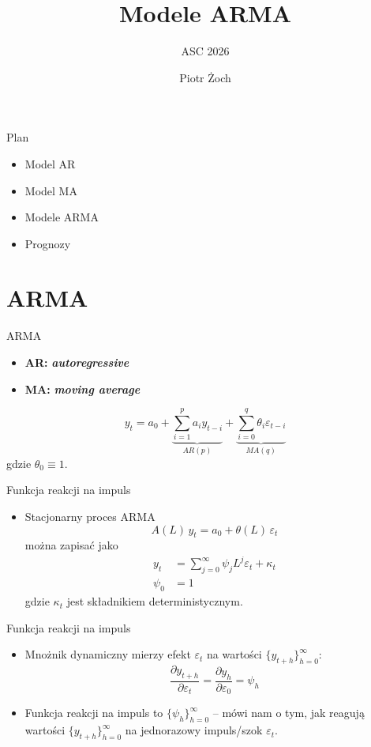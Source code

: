\documentclass[11pt,usenames,dvipsnames,aspectratio=169]{beamer}
\title{Modele ARMA}
\subtitle{ASC 2026}
\author{Piotr Żoch}
\date{}
\begin{document}
\begin{frame}[plain]
\vspace*{-0.6cm}
\titlepage
\end{frame}

\begin{frame}{Plan}
\begin{itemize}
    \item Model AR
    \item Model MA
    \item Modele ARMA
    \item Prognozy
\end{itemize}
\end{frame}

\section{ARMA}

\begin{frame}{ARMA}
\begin{itemize}
    \item \textbf{AR:} \textbf{\emph{autoregressive}}
    \item \textbf{MA:} \textbf{\emph{moving average}}
\end{itemize}
\[
y_{t}=a_{0}+\underbrace{\sum_{i=1}^{p}a_{i}y_{t-i}}_{AR(p)}+\underbrace{\sum_{i=0}^{q}\theta_{i}\varepsilon_{t-i}}_{MA(q)}
\]
gdzie $\theta_{0}\equiv 1$.
\end{frame}

\begin{frame}{Funkcja reakcji na impuls}
\begin{itemize}
    \item Stacjonarny proces ARMA
    \[
    A(L)\,y_{t}=a_{0}+\theta(L)\,\varepsilon_{t}
    \]
    można zapisać jako
    \begin{align*}
    y_{t} & =\sum_{j=0}^{\infty}\psi_{j}L^{j}\varepsilon_{t}+\kappa_{t}\\
    \psi_{0} & =1
    \end{align*}
    gdzie $\kappa_{t}$ jest składnikiem deterministycznym.
\end{itemize}
\end{frame}

\begin{frame}{Funkcja reakcji na impuls}
\begin{itemize}
    \item Mnożnik dynamiczny mierzy efekt $\varepsilon_{t}$ na wartości $\{y_{t+h}\}_{h=0}^{\infty}$:
    \[
    \frac{\partial y_{t+h}}{\partial \varepsilon_{t}}=\frac{\partial y_{h}}{\partial \varepsilon_{0}}=\psi_{h}
    \]
    \item Funkcja reakcji na impuls to $\{\psi_{h}\}_{h=0}^{\infty}$ -- mówi nam o tym, jak reagują wartości $\{y_{t+h}\}_{h=0}^{\infty}$ na jednorazowy impuls/szok $\varepsilon_{t}$.
\end{itemize}
\end{frame}
\end{document}
